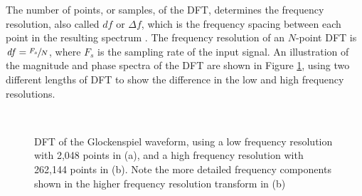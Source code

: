 \documentclass[report.tex]{subfiles}
\begin{document}
The number of points, or samples, of the DFT, determines the frequency resolution, also called $\mathit{df}$ or $\mathit{\Delta f}$, which is the frequency spacing between each point in the resulting spectrum \parencite{discretebook}. The frequency resolution of an $N$-point DFT is $\mathit{df} = \sfrac{F_{s}}{N}$, where $F_{s}$ is the sampling rate of the input signal. An illustration of the magnitude and phase spectra of the DFT are shown in Figure \ref{fig:glockdft}, using two different lengths of DFT to show the difference in the low and high frequency resolutions.

\begin{figure}[ht]
	\centering
	\\
	\caption{DFT of the Glockenspiel waveform, using a low frequency resolution with 2,048 points in (a), and a high frequency resolution with 262,144 points in (b). Note the more detailed frequency components shown in the higher frequency resolution transform in (b)}
	\label{fig:glockdft}
\end{figure}
\end{document}
